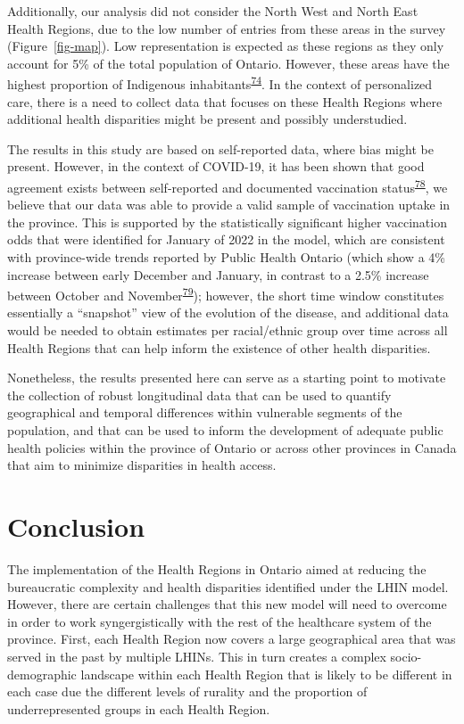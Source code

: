 \documentclass[
]{article}
\begin{document}
Additionally, our analysis did not consider the North West and North
East Health Regions, due to the low number of entries from these areas
in the survey (Figure~\ref{fig-map}). Low representation is expected as
these regions as they only account for 5\% of the total population of
Ontario. However, these areas have the highest proportion of Indigenous
inhabitants\textsuperscript{\protect\hyperlink{ref-ontariohealth}{74}}.
In the context of personalized care, there is a need to collect data
that focuses on these Health Regions where additional health disparities
might be present and possibly understudied.

The results in this study are based on self-reported data, where bias
might be present. However, in the context of COVID-19, it has been shown
that good agreement exists between self-reported and documented
vaccination
status\textsuperscript{\protect\hyperlink{ref-stephenson2022}{78}}, we
believe that our data was able to provide a valid sample of vaccination
uptake in the province. This is supported by the statistically
significant higher vaccination odds that were identified for January of
2022 in the model, which are consistent with province-wide trends
reported by Public Health Ontario (which show a 4\% increase between
early December and January, in contrast to a 2.5\% increase between
October and
November\textsuperscript{\protect\hyperlink{ref-ontario-covid}{79}});
however, the short time window constitutes essentially a ``snapshot''
view of the evolution of the disease, and additional data would be
needed to obtain estimates per racial/ethnic group over time across all
Health Regions that can help inform the existence of other health
disparities.

Nonetheless, the results presented here can serve as a starting point to
motivate the collection of robust longitudinal data that can be used to
quantify geographical and temporal differences within vulnerable
segments of the population, and that can be used to inform the
development of adequate public health policies within the province of
Ontario or across other provinces in Canada that aim to minimize
disparities in health access.

\hypertarget{conclusion}{%
\section{Conclusion}\label{conclusion}}

The implementation of the Health Regions in Ontario aimed at reducing
the bureaucratic complexity and health disparities identified under the
LHIN model. However, there are certain challenges that this new model
will need to overcome in order to work syngergistically with the rest of
the healthcare system of the province. First, each Health Region now
covers a large geographical area that was served in the past by multiple
LHINs. This in turn creates a complex socio-demographic landscape within
each Health Region that is likely to be different in each case due the
different levels of rurality and the proportion of underrepresented
groups in each Health Region.
\end{document}

